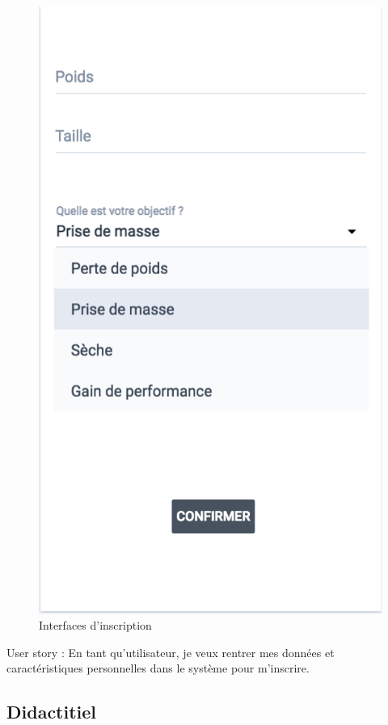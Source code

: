 \begin{figure}[!h]
\includegraphics[scale=0.3]{ihms/caracteristiques}
\caption{Interfaces d'inscription}
\end{figure}


\begin{itshape}
User story : En tant qu'utilisateur, je veux rentrer mes données et caractéristiques personnelles dans le système pour m'inscrire.
\end{itshape}

\subsection{Didactitiel}

